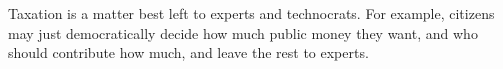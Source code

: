 Taxation is a matter best left to experts and technocrats.
For example, citizens may just democratically decide how much public money they want, and who should contribute how much, and leave the rest to experts.